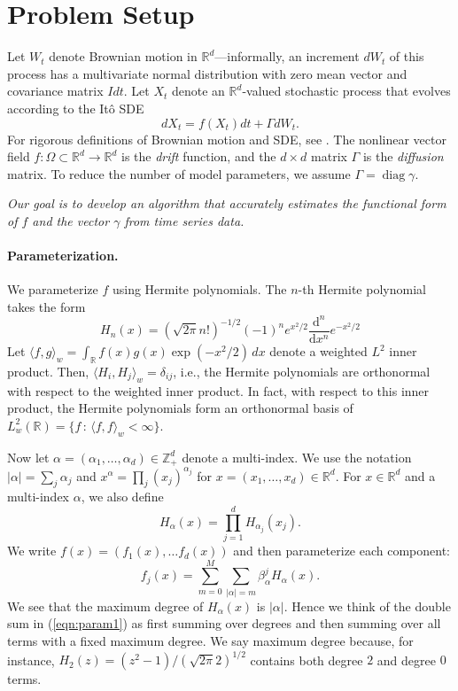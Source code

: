 \documentclass{article}
\newcommand{\opdiag}{\ensuremath{\operatorname{diag}}}
\begin{document}
\section{Problem Setup}
Let $W_t$ denote Brownian motion in $\mathbb{R}^d$---informally, an increment $dW_t$ of this process has a multivariate normal distribution with zero mean vector and covariance matrix $I dt$.  Let $X_t$ denote an $\mathbb{R}^d$-valued stochastic process that evolves according to the It\^{o} SDE
\begin{equation} \label{eqn:sde}
d X_t = f( X_t) dt + \Gamma d W_t.
\end{equation}
For rigorous definitions of Brownian motion and SDE, see \cite{bhattacharya_stochastic_2009, oksendal_stochastic_2003}.  The nonlinear vector field $f : \Omega \subset \mathbb{R}^d \to \mathbb{R}^d$ is the \emph{drift} function, and the $d \times d$ matrix $\Gamma$ is the \emph{diffusion} matrix.  To reduce the number of model parameters, we assume $\Gamma = \opdiag \gamma$.

\emph{Our goal is to develop an algorithm that accurately estimates the functional form of $f$ and the vector $\gamma$ from time series data.}

\paragraph{Parameterization.} We parameterize $f$ using Hermite polynomials.  The $n$-th Hermite polynomial takes the form
\begin{equation}
\label{eqn:hermdef}
H_n(x) = (\sqrt{2 \pi} n!)^{-1/2} (-1)^n e^{x^2/2} \dfrac{\mathrm{d}^n}{\mathrm{d}x^n} e^{-x^2/2}
\end{equation}
Let $\langle f, g \rangle_w = \int_{\mathbb{R}} f(x) g(x) \exp(-x^2/2) \, dx$ denote a weighted $L^2$ inner product.  Then, $\langle H_i, H_j \rangle_w = \delta_{ij}$, i.e., the Hermite polynomials are orthonormal with respect to the weighted inner product.  In fact, with respect to this inner product, the Hermite polynomials form an orthonormal basis of $L^2_w(\mathbb{R}) = \{ f \, : \, \langle f, f \rangle_w < \infty \}$.

Now let $\alpha = (\alpha_1, \ldots, \alpha_d) \in \mathbb{Z}^d_+$ denote a multi-index.  We use the notation $|\alpha| = \sum_j \alpha_j$ and $x^\alpha = \prod_j (x_j)^{\alpha_j}$ for $x = (x_1, \ldots, x_d) \in \mathbb{R}^d$.  For $x \in \mathbb{R}^d$ and a multi-index $\alpha$, we also define
\begin{equation}
\label{eqn:hermmultiindex}
H_\alpha(x) = \prod_{j=1}^d H_{\alpha_j}(x_j).
\end{equation}
We write $f(x) = (f_1(x), \ldots f_d(x))$ and then parameterize each component:
\begin{equation}
\label{eqn:param1}
f_j(x) = \sum_{m=0}^M \sum_{|\alpha|=m} \beta^j_\alpha H_\alpha(x).
\end{equation}
We see that the maximum degree of $H_\alpha(x)$ is $|\alpha|$.  Hence we think of the double sum in (\ref{eqn:param1}) as first summing over degrees and then summing over all terms with a fixed maximum degree.  We say maximum degree because, for instance, $H_2(z) = (z^2-1)/(\sqrt{2 \pi} 2)^{1/2}$ contains both degree $2$ and degree $0$ terms.
\end{document}
